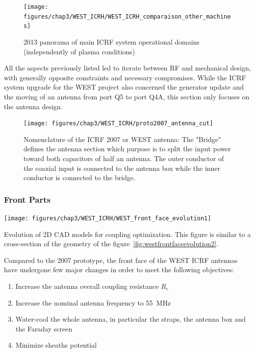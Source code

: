 \begin{figure}
	\centering
	\texttt{[image: figures/chap3/WEST\_ICRH/WEST\_ICRH\_comparaison\_other\_machines]}
	\caption{2013 panorama of main ICRF system operational domains (independently of plasma conditions)}
	\label{fig:westicrhcomparaisonothermachines}
\end{figure}

All the aspects previously listed led to iterate between RF and mechanical design, with generally opposite constraints and necessary compromises. While the ICRF system upgrade for the WEST project also concerned the generator update and the moving of an antenna from port Q5 to port Q4A, this section only focuses on the antenna design. 


\begin{figure}
	\centering
	\texttt{[image: figures/chap3/WEST\_ICRH/proto2007\_antenna\_cut]}
	\caption{Nomenclature of the ICRF 2007 or WEST antenna: The "Bridge" defines the antenna section which purpose is to split the input power toward both capacitors of half an antenna. The outer conductor of the coaxial input is connected to the antenna box while the inner conductor is connected to the bridge.}
	\label{fig:proto2007antennacut}
\end{figure}


\subsubsection{Front Parts}
\begin{marginfigure}
	\centering
	\texttt{[image: figures/chap3/WEST\_ICRH/WEST\_front\_face\_evolution1]}
	\caption{Evolution of 2D CAD models for coupling optimization. This figure is similar to a cross-section of the geometry of the figure~\ref{fig:westfrontfaceevolution2}. }
	\label{fig:westfrontfaceevolution1}
\end{marginfigure}

Compared to the 2007 prototype, the front face of the WEST ICRF antennas have undergone few major changes in order to meet the following objectives:
\begin{enumerate}
	\item Increase the antenna overall coupling resistance $R_c$
	\item Increase the nominal antenna frequency to 55~MHz
	\item Water-cool the whole antenna, in particular the straps, the antenna box and the Faraday screen
	\item Minimize sheaths potential
\end{enumerate}

